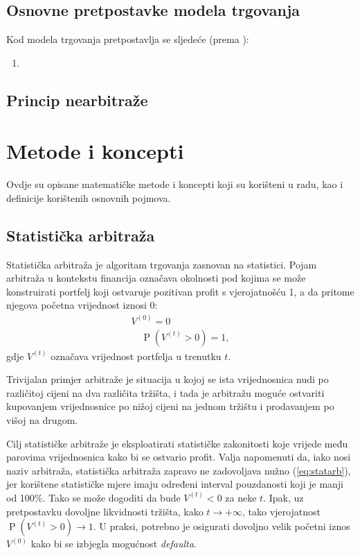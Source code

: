 \documentclass[lmodern, utf8, diplomski, numeric]{fer}
\newcommand{\prob}[1]{\operatorname{P}\q(#1\w)}
\newcommand{\q}{\left}
\newcommand{\w}{\right}
\begin{document}
  \section{Osnovne pretpostavke modela trgovanja}
  Kod modela trgovanja pretpostavlja se sljedeće (prema \citep{finmat}):
  \begin{enumerate}
    \item 
  \end{enumerate}
  
  \section{Princip nearbitraže}
  

  \chapter{Metode i koncepti}
  Ovdje su opisane matematičke metode i koncepti koji su korišteni u radu, kao i definicije korištenih osnovnih pojmova.
  
  \section{Statistička arbitraža}
  Statistička arbitraža  je algoritam trgovanja zasnovan na statistici.
  Pojam arbitraža u kontekstu financija označava okolnosti pod kojima se može konstruirati portfelj koji ostvaruje pozitivan profit s vjerojatnošću 1, a da pritome njegova početna vrijednost iznosi 0:
  \begin{equation}
  \begin{gathered}
  \label{eq:statarb}
  V^{(0)} = 0\\
  \quad \prob{V^{\q(t\w)} > 0} = 1,
  \end{gathered}
  \end{equation}
  gdje $V^{\q(t\w)}$ označava vrijednost portfelja u trenutku $t$.
  
  Trivijalan primjer arbitraže je situacija u kojoj se ista vrijednosnica nudi po različitoj cijeni na dva različita tržišta, i tada je arbitražu moguće ostvariti kupovanjem vrijednosnice po nižoj cijeni na jednom tržištu i prodavanjem po višoj na drugom.
  
  Cilj statističke arbitraže je eksploatirati statističke zakonitosti koje vrijede među parovima vrijednosnica kako bi se ostvario profit.  
  Valja napomenuti da, iako nosi naziv arbitraža, statistička arbitraža zapravo ne zadovoljava nužno (\ref{eq:statarb}), jer korištene statističke mjere imaju određeni interval pouzdanosti koji je manji od 100\%.
  Tako se može dogoditi da bude $V^{\q(t\w)} < 0$ za neke $t$.
  Ipak, uz pretpostavku dovoljne likvidnosti tržišta, kako $t \to +\infty$, tako vjerojatnost $\prob{V^{\q(t\w)} > 0} \to 1$.
  U praksi, potrebno je osigurati dovoljno velik početni iznos $V^{(0)}$ kako bi se izbjegla mogućnost \textit{defaulta}.
  
\end{document}
